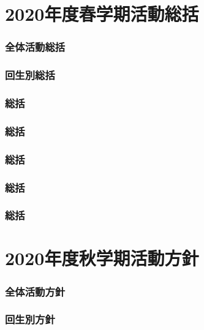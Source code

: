 \part{2020年度春学期活動総括}
\section{全体活動総括}


\section{回生別総括}



%

\section{\kaikeiDepartment{}総括}

\section{\kensuiDepartment{}総括}

\section{\syogaiDepartment{}総括}

\section{\systemDepartment{}総括}

\section{\soumuDepartment{}総括}


\newpage
\part{2020年度秋学期活動方針}
\section{全体活動方針}


\section{回生別方針}





